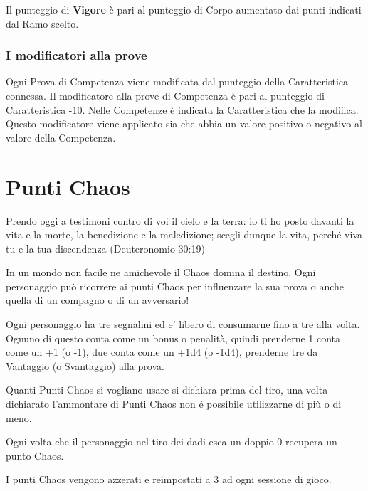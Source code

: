 \documentclass[12pt,a4paper,twoside,openany]{book}
\begin{document}
\begin{multicols}{2}
Il punteggio di \textbf{Vigore} è pari al punteggio di Corpo aumentato dai punti indicati dal Ramo scelto.

\subsubsection{I modificatori alla prove}

Ogni Prova di Competenza viene modificata dal punteggio della Caratteristica connessa. 
Il modificatore alla prove di Competenza è pari al punteggio di Caratteristica -10. Nelle Competenze è indicata la Caratteristica che la modifica. Questo modificatore viene applicato sia che abbia un valore positivo o negativo al valore della Competenza.

\end{multicols}

\section{Punti Chaos}

\begin{multicols}{2}
	

\begin{changemargin}{0.3cm}{0.3cm}\begin{enfasi}{
Prendo oggi a testimoni contro di voi il cielo e la terra: io ti ho posto davanti la vita e la morte, la benedizione e la maledizione; scegli dunque la vita, perché viva tu e la tua discendenza (Deuteronomio 30:19)
}\end{enfasi}\end{changemargin}

In un mondo non facile ne amichevole il Chaos domina il destino. Ogni personaggio può ricorrere ai punti Chaos per influenzare la sua prova o anche quella di un compagno o di un avversario!

Ogni personaggio ha tre segnalini ed e' libero di consumarne fino a tre alla volta. Ognuno di questo conta come un bonus o penalità, quindi prenderne 1 conta come un +1 (o -1), due conta come un +1d4 (o -1d4), prenderne tre da Vantaggio (o Svantaggio) alla prova. 

Quanti Punti Chaos si vogliano usare si dichiara prima del tiro, una volta dichiarato l'ammontare di Punti Chaos non é possibile utilizzarne di più o di meno.

Ogni volta che il personaggio nel tiro dei dadi esca un doppio 0 recupera un punto Chaos.

I punti Chaos vengono azzerati e reimpostati a 3 ad ogni sessione di gioco.

\end{multicols}
\end{document}
